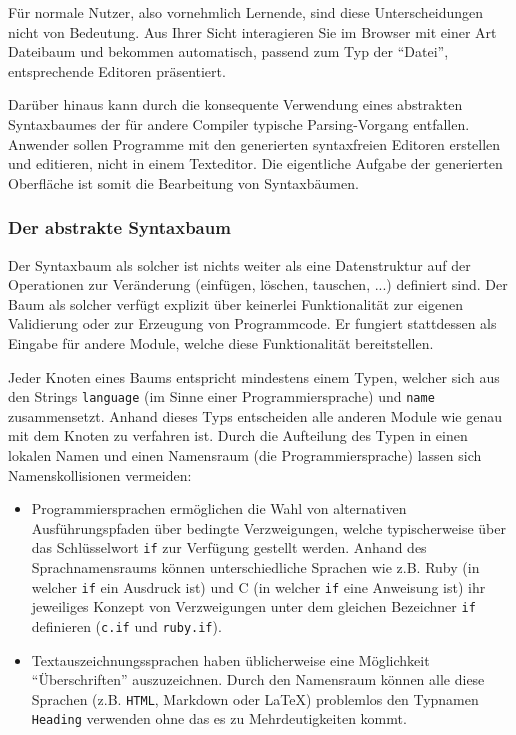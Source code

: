 \documentclass[paper=a4,fontsize=12pt,parskip=half]{scrartcl}
\begin{document}
Für normale Nutzer, also vornehmlich Lernende, sind diese Unterscheidungen nicht von Bedeutung. Aus Ihrer Sicht interagieren Sie im Browser mit einer Art Dateibaum und bekommen automatisch, passend zum Typ der \enquote{Datei}, entsprechende Editoren präsentiert.

Darüber hinaus kann durch die konsequente Verwendung eines abstrakten Syntaxbaumes der für andere Compiler typische Parsing-Vorgang entfallen. Anwender sollen Programme mit den generierten syntaxfreien Editoren erstellen und editieren, nicht in einem Texteditor. Die eigentliche Aufgabe der generierten Oberfläche ist somit die Bearbeitung von Syntaxbäumen.

\subsubsection{Der abstrakte Syntaxbaum}

Der Syntaxbaum als solcher ist nichts weiter als eine Datenstruktur auf der Operationen zur Veränderung (einfügen, löschen, tauschen, ...) definiert sind. Der Baum als solcher verfügt explizit über keinerlei Funktionalität zur eigenen Validierung oder zur Erzeugung von Programmcode. Er fungiert stattdessen als Eingabe für andere Module, welche diese Funktionalität bereitstellen.

Jeder Knoten eines Baums entspricht mindestens einem Typen, welcher sich aus den Strings \texttt{language} (im Sinne einer Programmiersprache) und \texttt{name} zusammensetzt. Anhand dieses Typs entscheiden alle anderen Module wie genau mit dem Knoten zu verfahren ist. Durch die Aufteilung des Typen in einen lokalen Namen und einen Namensraum (die Programmiersprache) lassen sich Namenskollisionen vermeiden:

\begin{itemize}
\item Programmiersprachen ermöglichen die Wahl von alternativen Ausführungspfaden  über bedingte Verzweigungen, welche typischerweise über das Schlüsselwort \texttt{if} zur Verfügung gestellt werden. Anhand des Sprachnamensraums können unterschiedliche Sprachen wie z.B. Ruby (in welcher \texttt{if} ein Ausdruck ist) und C (in welcher \texttt{if} eine Anweisung ist) ihr jeweiliges Konzept von Verzweigungen unter dem gleichen Bezeichner \texttt{if} definieren (\texttt{c.if} und \texttt{ruby.if}).
\item Textauszeichnungssprachen haben üblicherweise eine Möglichkeit \enquote{Überschriften} auszuzeichnen. Durch den Namensraum können alle diese Sprachen (z.B. \texttt{HTML}, Markdown oder \LaTeX) problemlos den Typnamen \texttt{Heading} verwenden ohne das es zu Mehrdeutigkeiten kommt.
\end{itemize}
\end{document}
